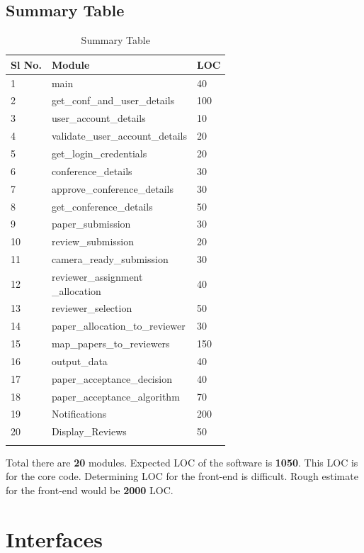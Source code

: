 \documentclass[english,a4paper,12pt]{report}
\begin{document}
\section{Summary Table}
{

\begin{center}
    \begin{longtable} { | p{1.5cm} | p{8cm}| p{4cm}|}
\hline 
\textbf{Sl No.} & 
\textbf{Module} & \textbf{LOC} \\ 
\hline 
 1 & main & 40 \\ \hline 
 2 & get\_conf\_and\_user\_details & 100 \\ \hline 
 3 & user\_account\_details & 10\\ \hline 
 4  & validate\_user\_account\_details & 20 \\\hline 
 5 & get\_login\_credentials & 20\\ \hline 
 6 & conference\_details & 30\\ \hline 
 7 & approve\_conference\_details & 30\\ 
 \hline 
 8 & get\_conference\_details & 50\\ 
 \hline 
 9 &  paper\_submission & 30\\ 
 \hline 
 10 & review\_submission & 20\\ 
 \hline 
 11 & camera\_ready\_submission & 30\\ 
 \hline
12 & \makecell { reviewer\_assignment \\ 
\_allocation} & 40\\ 
\hline 
13 & reviewer\_selection & 50\\ \hline 
14 &  paper\_allocation\_to\_reviewer & 30\\ \hline  
15 & map\_papers\_to\_reviewers & 150\\ 
\hline 
16 & output\_data & 40 \\
\hline 
17 & paper\_acceptance\_decision & 40\\ 
\hline 
18 & paper\_acceptance\_algorithm & 70\\ 
\hline 
19 & Notifications & 200\\
\hline 
20 & Display\_Reviews & 50\\ 
\hline 
    \caption{Summary Table}
    \label{tab:summary_table}
    \end{longtable}
\end{center}
}
Total there are \textbf{20} modules.
Expected LOC of the software is \textbf{1050}. This LOC is for the core code. Determining LOC for the front-end is difficult. Rough estimate for the front-end would be \textbf{2000} LOC.
\chapter{Interfaces}

\end{document}
